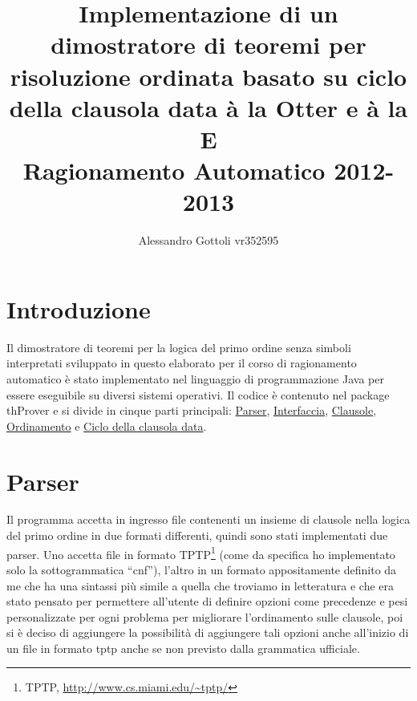 \documentclass[a4paper,11pt]{article} %
\newcommand{\package}{\textsf}
\begin{document}
\title{Implementazione di un dimostratore di teoremi per risoluzione ordinata 
       basato su ciclo della clausola data à la Otter e à la E \\
       Ragionamento Automatico 2012-2013}
\author{Alessandro Gottoli vr352595}
\maketitle

\section*{Introduzione}
Il dimostratore di teoremi per la logica del primo ordine senza simboli interpretati
sviluppato in questo elaborato per il corso di ragionamento automatico
è stato implementato nel linguaggio di 
programmazione Java per essere eseguibile su diversi sistemi
operativi.
Il codice è contenuto nel package \package{thProver} e si divide in cinque parti
principali: \hyperref[sec: parser]{Parser}, \hyperref[sec: interfaccia]{Interfaccia},
\hyperref[sec: data]{Clausole}, %
\hyperref[sec: ordinamento]{Ordinamento} e 
\hyperref[sec: ciclo]{Ciclo della clausola data}.

\section{Parser}\label{sec: parser}
Il programma accetta in ingresso file contenenti un insieme di clausole nella logica
del primo ordine in due formati differenti, quindi sono
stati implementati due parser. %
Uno accetta file in formato 
\textsf{TPTP}\footnote{\textsf{TPTP}, \url{http://www.cs.miami.edu/~tptp/}} 
(come da specifica ho implementato solo la sottogrammatica ``cnf''), l'altro
in un formato appositamente definito da me che ha una sintassi più simile a 
quella che troviamo in letteratura e che era stato pensato per permettere 
all'utente di definire opzioni come precedenze e pesi
personalizzate per ogni problema
per migliorare l'ordinamento sulle clausole, %
poi si è
deciso di aggiungere la possibilità di aggiungere tali opzioni anche all'inizio
di un file in formato tptp anche se non previsto dalla grammatica ufficiale.
 
\end{document}
